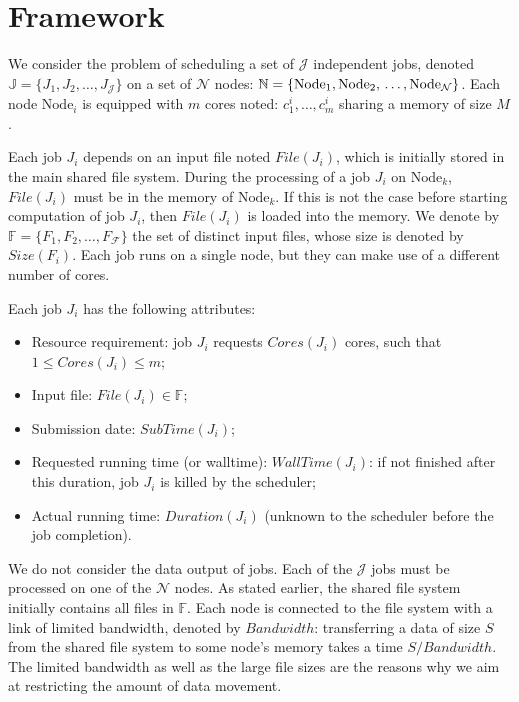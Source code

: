 \documentclass[sigconf,review,anonymous]{acmart}
\newcommand{\Node}[1]{\ensuremath{\mathrm{Node}_{#1}}\xspace}
\newcommand{\file}{\ensuremath{\mathit{File}}\xspace}
\newcommand{\size}{\ensuremath{\mathit{Size}}\xspace}
\newcommand{\memory}{\ensuremath{\mathit{M}}\xspace}
\newcommand{\duration}{\mathit{Duration}\xspace}
\newcommand{\bandwidth}{\mathit{Bandwidth}\xspace}
\newcommand{\core}{\mathit{Cores}\xspace}
\newcommand{\submissiontime}{\mathit{SubTime}\xspace}
\newcommand{\walltime}{\mathit{WallTime}\xspace}
\newcommand{\fileset}{\ensuremath{\mathbb{F}}\xspace}
\newcommand{\filenum}{\ensuremath{\mathcal{F}}\xspace}
\newcommand{\jobset}{\ensuremath{\mathbb{J}}\xspace}
\newcommand{\jobnum}{\ensuremath{\mathcal{J}}\xspace}
\newcommand{\nodeset}{\ensuremath{\mathbb{N}}\xspace}
\newcommand{\nodenum}{\ensuremath{\mathcal{N}}\xspace}
\begin{document}
\section{Framework}\label{sec.framework}

We consider the problem of scheduling a set of $\jobnum$ independent jobs,
denoted $\jobset = \{J_1, J_2, \ldots, J_\jobnum\}$ on a set of
$\nodenum$ nodes:
$\nodeset = \{\Node{1}, \Node{2}, \\ \ldots, \Node{\nodenum}\}$.
Each node $\Node{i}$ is equipped with $m$ cores noted:
$c^i_1,\ldots,c^i_m$ sharing a memory of size $\memory$.

Each job $J_i$ depends on an input file noted $\file(J_i)$, which is
initially stored in the main shared file system.  During the
processing of a job $J_i$ on $\Node{k}$, $\file(J_i)$ must be in
the memory of $\Node{k}$. If this is not the case before starting
computation of job $J_i$, then $\file(J_i)$ is loaded into the
memory.  We denote by $\fileset = \{F_1, F_2, \ldots, F_\filenum\}$ the set
of distinct input files, whose size is denoted by $\size(F_i)$. Each
job runs on a single node, but they can make use of a different number
of cores.



Each job $J_i$ has the following attributes:
\begin{itemize}
\item Resource requirement: job $J_i$ requests $\core(J_i)$  cores, such that $1 \leq \core(J_i) \leq m$;
\item Input file: $\file(J_i) \in \fileset$;
\item Submission date: $\submissiontime(J_i)$;
\item Requested running time (or walltime): $\walltime(J_i)$: if not
  finished after this duration, job $J_i$ is killed by the scheduler;
\item Actual running time: $\duration(J_i)$ (unknown to  the scheduler
  before the job completion).
\end{itemize}

We do not consider the data output of jobs.
Each of the $\jobnum$ jobs must be processed on one of the $\nodenum$ nodes.  As
stated earlier, the shared file system initially contains all files
in $\fileset$.  Each node is connected to the file system with a link
of limited bandwidth, denoted by $\bandwidth$: transferring a data of
size $S$ from the shared file system to some node's memory takes a
time $S/\bandwidth$.
The limited bandwidth
as well as the large file sizes are the reasons why we aim at
restricting the amount of data movement.
\end{document}
